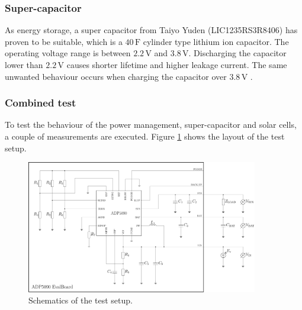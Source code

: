 \subsubsection{Super-capacitor}
As energy storage, a super capacitor from Taiyo Yuden (LIC1235RS3R8406) has proven to be suitable, which is a $40\,\text{F}$ cylinder type lithium ion capacitor.
The operating voltage range is between $2.2\,\text{V}$ and $3.8\,\text{V}$.
Discharging the capacitor lower than $2.2\,\text{V}$ causes shorter lifetime and higher leakage current.
The same unwanted behaviour occurs when charging the capacitor over $3.8\,\text{V}$ \cites{yuden}.

\subsubsection{Combined test}
To test the behaviour of the power management, super-capacitor and solar cells, a couple of measurements are executed.
Figure \ref{development:test} shows the layout of the test setup.

\begin{figure}[ht]
	\centering
	\includegraphics[width=0.9\textwidth]{4-development/hardware/graphics/testaufbau.pdf}
	\caption{Schematics of the test setup.\label{development:test}}
\end{figure}

